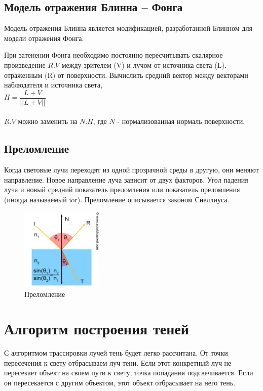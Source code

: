 \subsection*{Модель отражения Блинна – Фонга}

Модель отражения Блинна является модификацией, разработанной Блинном для модели отражения Фонга.

При затенении Фонга необходимо постоянно пересчитывать скалярное произведение $R.V$ между зрителем (V) и лучом от источника света (L), отраженным (R) от поверхности.
Вычислить средний вектор между векторами наблюдателя и источника света,
\\

$H = \dfrac{L + V}{||L + V||}$\\\\
$R.V$ можно заменить на $N.H$, где $N$ - нормализованная нормаль поверхности.



\subsection*{Преломление}
Когда световые лучи переходят из одной прозрачной среды в другую, они меняют направление. Новое направление луча зависит от двух факторов. Угол падения луча и новый средний показатель преломления или показатель преломления (иногда называемый ior).
Преломление описывается законом Снеллиуса.

\begin{figure}[ht]
  \centering
  \includegraphics[height=0.3\textwidth, width=0.35\textwidth]{img/refraction.png}
  \caption{Преломление}
\end{figure}


\section{Алгоритм построения теней}

С алгоритмом трассировки лучей тень будет легко рассчитана.
От точки пересечения к свету отбрасываем луч тени. Если этот конкретный луч не пересекает объект на своем пути к свету, точка попадания подсвечивается. Если он пересекается с другим объектом, этот объект отбрасывает на него тень.

